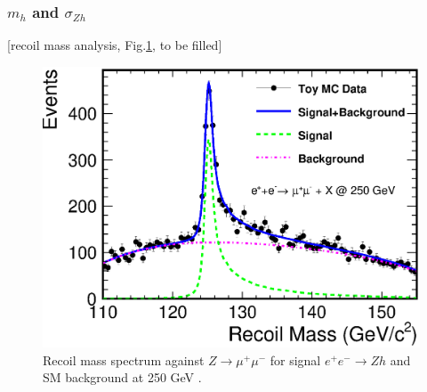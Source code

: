 
\subsubsection{$m_h$ and $\sigma_{Zh}$}
[recoil mass analysis, Fig.\ref{fig:RecoilMassLep250}, to be filled]
\begin{figure}
\begin{center}
\includegraphics[width=0.85\hsize]{chapters/figures/RecoilMassLep250.eps}
\end{center}
  \caption{Recoil mass spectrum against
 $Z\to\mu^+\mu^-$ for signal $e^+e^-\to Zh$ and SM background 
  at 250 GeV \cite{Yan:2016xyx}.}
  \label{fig:RecoilMassLep250}
\end{figure}

